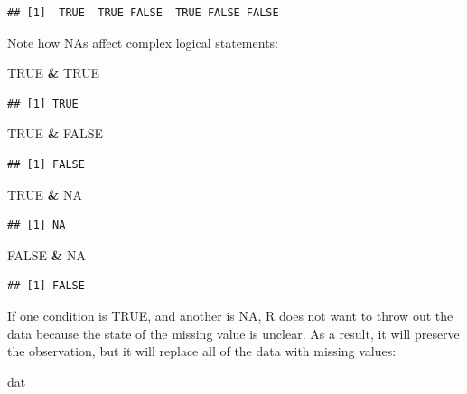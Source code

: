 \documentclass[]{book}
\newenvironment{Shaded}{\begin{snugshade}}{\end{snugshade}}
\newcommand{\NormalTok}[1]{#1}
\newcommand{\OperatorTok}[1]{\textcolor[rgb]{0.81,0.36,0.00}{\textbf{#1}}}
\newcommand{\OtherTok}[1]{\textcolor[rgb]{0.56,0.35,0.01}{#1}}
\newcommand{\StringTok}[1]{\textcolor[rgb]{0.31,0.60,0.02}{#1}}
\theoremstyle{definition}
\theoremstyle{definition}
\theoremstyle{definition}
\theoremstyle{remark}
\begin{document}
\begin{verbatim}
## [1]  TRUE  TRUE FALSE  TRUE FALSE FALSE
\end{verbatim}

Note how NAs affect complex logical statements:

\begin{Shaded}
\begin{Highlighting}[]
\OtherTok{TRUE} \OperatorTok{&}\StringTok{ }\OtherTok{TRUE}
\end{Highlighting}
\end{Shaded}

\begin{verbatim}
## [1] TRUE
\end{verbatim}

\begin{Shaded}
\begin{Highlighting}[]
\OtherTok{TRUE} \OperatorTok{&}\StringTok{ }\OtherTok{FALSE}
\end{Highlighting}
\end{Shaded}

\begin{verbatim}
## [1] FALSE
\end{verbatim}

\begin{Shaded}
\begin{Highlighting}[]
\OtherTok{TRUE} \OperatorTok{&}\StringTok{ }\OtherTok{NA}
\end{Highlighting}
\end{Shaded}

\begin{verbatim}
## [1] NA
\end{verbatim}

\begin{Shaded}
\begin{Highlighting}[]
\OtherTok{FALSE} \OperatorTok{&}\StringTok{ }\OtherTok{NA}
\end{Highlighting}
\end{Shaded}

\begin{verbatim}
## [1] FALSE
\end{verbatim}

If one condition is TRUE, and another is NA, R does not want to throw
out the data because the state of the missing value is unclear. As a
result, it will preserve the observation, but it will replace all of the
data with missing values:

\begin{Shaded}
\begin{Highlighting}[]
\NormalTok{dat}
\end{Highlighting}
\end{Shaded}
\end{document}

